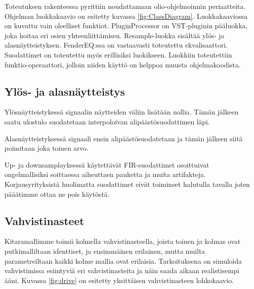 \documentclass[11pt, a4paper, oneside]{article}
\begin{document}
	Toteutuksen rakenteessa pyrittiin noudattamaan olio-ohjelmoinnin periaatteita. Ohjelman luokkakaavio on esitetty kuvassa \ref{fig:ClassDiagram}. Luokkakaaviossa on kuvattu vain oleelliset funktiot. PluginProcessor on VST-pluginin pääluokka, joka hoitaa eri osien yhteenliittämisen. Resample-luokka sisältää ylös- ja alasnäytteistyksen. FenderEQ:ssa on vastaavasti toteutettu ekvalisaattori. Suodattimet on toteutettu myös erillisiksi luokikseen. Luokkiin toteutettiin funktio-operaattori, jolloin niiden käyttö on helppoa muusta ohjelmakoodista.
 
 \subsection{Ylös- ja alasnäytteistys}
 
Ylösnäytteistykessä signaalin näytteiden väliin lisätään nollia. Tämän jälkeen saatu ulostulo suodatetaan interpoloivan alipäästösuodattimen läpi.

Alasnäytteistyksessä signaali ensin alipäästösuodatetaan ja tämän jälkeen siitä poimitaan joka toinen arvo.

Up- ja downsamplayksessä käytettävät FIR-suodattimet osoittuivat ongelmallisiksi soittaessa aiheuttaen pauketta ja muita artifakteja. Korjausyrityksistä huolimatta suodattimet eivät toimineet halutulla tavalla joten pääätimme ottaa ne pois käytöstä. 



	

 \subsection{Vahvistinasteet}
 
 Kitaramallimme toimii kolmella vahvistinasteella, joista toinen ja kolmas ovat putkimalliltaan identtiset, ja ensimmäinen erilainen, mutta muilta parametreiltaan kaikki kolme mallia ovat erilaisia.
 Tarkoituksena on simuloida vahvistimissa esiintyviä eri vahvistinasteita ja näin saada aikaan realistisempi ääni.
 Kuvassa \ref{fig:drive} on esitetty yksittäisen vahvistinasteen lohkokaavio. 
 
\end{document}
